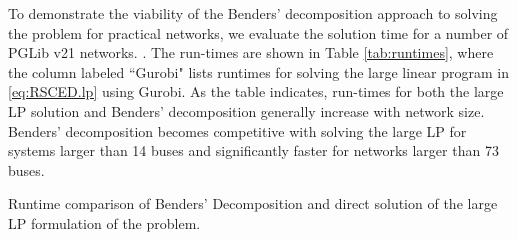 To demonstrate the viability of the Benders' decomposition approach to solving the \RSCED{} problem for practical networks, we evaluate the solution time for a number of PGLib v21 networks. . The run-times are shown in Table \ref{tab:runtimes}, where the column labeled ``Gurobi" lists runtimes for solving the large linear program in \eqref{eq:RSCED.lp} using Gurobi. As the table indicates, run-times for both the large LP solution and Benders' decomposition generally increase with network size. Benders' decomposition becomes competitive with solving the large LP for systems larger than 14 buses and significantly 
faster for networks larger than 73 buses.
%
\begin{table}[ht]
    \centering
    \caption{Runtime comparison of Benders' Decomposition and direct solution of the large LP formulation of the \RSCED{} problem.}
    \label{tab:runtimes}
    \setlength\belowcaptionskip{-1in}
\end{table}
%

